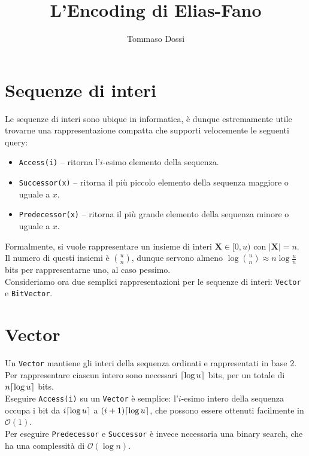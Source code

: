 \documentclass{article}
\title{L'Encoding di Elias-Fano}
\author{Tommaso Dossi}
\DeclarePairedDelimiter\ceil{\lceil}{\rceil}
\newcommand{\X}{\mathbf{X}}
\newcommand{\ttt}{\texttt}
\newcommand*{\OO}{\ensuremath{\mathcal{O}}}
\begin{document}
\maketitle


\section{Sequenze di interi}

Le sequenze di interi sono ubique in informatica, \`e dunque estremamente utile trovarne una rappresentazione compatta che supporti velocemente le seguenti query:
\begin{itemize}
    \item \ttt{Access(i)} -- ritorna l'$i$-esimo elemento della sequenza.
    \item \ttt{Successor(x)} -- ritorna il pi\`u piccolo elemento della sequenza maggiore o uguale a $x$.
    \item \ttt{Predecessor(x)} -- ritorna il pi\`u grande elemento della sequenza minore o uguale a $x$.
\end{itemize}

Formalmente, si vuole rappresentare un insieme di interi $\X \in [0, u)$ con $|\X| = n$.\\
Il numero di questi insiemi \`e $\binom{u}{n}$, dunque servono almeno $\log \binom{u}{n} \approx n \log \frac{u}{n}$ bits per rappresentarne uno, al caso pessimo.\\
Consideriamo ora due semplici rappresentazioni per le sequenze di interi: \ttt{Vector} e \ttt{BitVector}.

\section{Vector}

Un \ttt{Vector} mantiene gli interi della sequenza ordinati e rappresentati in base $2$. Per rappresentare ciascun intero sono necessari $\ceil{\log u}$ bits, per un totale di $n\ceil{\log u}$ bits. \\
Eseguire \ttt{Access(i)} su un \texttt{Vector} \`e semplice: l'$i$-esimo intero della sequenza occupa i bit da $i \ceil{\log u}$ a $(i + 1) \ceil{\log u}$, che possono essere ottenuti facilmente in $\OO(1)$. \\
Per eseguire \ttt{Predecessor} e \ttt{Successor} \`e invece necessaria una binary search, che ha una complessit\`a di $\OO(\log n)$.
\end{document}
